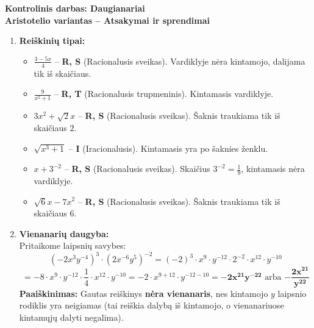\documentclass[12pt,a4paper]{article}
\begin{document}
\begin{center}
    {\Large \textbf{Kontrolinis darbas: Daugianariai}}\\[0.3cm]
    {\large \textbf{Aristotelio variantas -- Atsakymai ir sprendimai}}
\end{center}
\vspace{0.5cm}

\begin{enumerate}
    \item \textbf{Reiškinių tipai:}
    \begin{itemize}
        \item[a)] $\displaystyle \frac{3-5x}{4}$ -- \textbf{R, S} (Racionalusis sveikas). Vardiklyje nėra kintamojo, dalijama tik iš skaičiaus.
        \item[b)] $\displaystyle \frac{9}{x^2 + 1}$ -- \textbf{R, T} (Racionalusis trupmeninis). Kintamasis vardiklyje.
        \item[c)] $\displaystyle 3x^2 + \sqrt{2} x$ -- \textbf{R, S} (Racionalusis sveikas). Šaknis traukiama tik iš skaičiaus $2$.
        \item[d)] $\displaystyle \sqrt{x^3 + 1}$ -- \textbf{I} (Iracionalusis). Kintamasis yra po šaknies ženklu.
        \item[e)] $\displaystyle x + 3^{-2}$ -- \textbf{R, S} (Racionalusis sveikas). Skaičius $3^{-2} = \frac{1}{9}$, kintamasis nėra vardiklyje.
        \item[f)] $\displaystyle \sqrt{6}x - 7x^2$ -- \textbf{R, S} (Racionalusis sveikas). Šaknis traukiama tik iš skaičiaus $6$.
    \end{itemize}

    \vspace{0.3cm}
    \item \textbf{Vienanarių daugyba:} \\
    Pritaikome laipsnių savybes:
    $$ \left( -2x^3y^{-4} \right)^3 \cdot \left( 2x^{-6}y^5 \right)^{-2} = (-2)^3 \cdot x^9 \cdot y^{-12} \cdot 2^{-2} \cdot x^{12} \cdot y^{-10} $$
    $$ = -8 \cdot x^9 \cdot y^{-12} \cdot \frac{1}{4} \cdot x^{12} \cdot y^{-10} = -2 \cdot x^{9+12} \cdot y^{-12-10} = \mathbf{-2x^{21}y^{-22}} \text{ arba } \mathbf{-\frac{2x^{21}}{y^{22}}} $$
    \textbf{Paaiškinimas:} Gautas reiškinys \textbf{nėra vienanaris}, nes kintamojo $y$ laipsnio rodiklis yra neigiamas (tai reiškia dalybą iš kintamojo, o vienanariuose kintamųjų dalyti negalima).


\end{enumerate}
\end{document}
